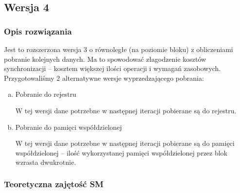 \subsection{Wersja 4}

\subsubsection{Opis rozwiązania}

Jest to rozszerzona wersja 3 o równoległe (na poziomie bloku) z obliczeniami pobranie kolejnych danych. Ma to spowodować złagodzenie kosztów synchronizacji -- kosztem większej ilości operacji i wymagań zasobowych.\\
Przygotowaliśmy 2 alternatywne wersje wyprzedzającego pobrania:

\begin{enumerate}[(a)]

\item Pobranie do rejestru

W tej wersji dane potrzebne w następnej iteracji pobierane są do rejestru.



\item Pobranie do pamięci współdzielonej

W tej wersji dane potrzebne w następnej iteracji pobierane są do pamięci współdzielonej -- ilość wykorzystanej pamięci współdzielonej przez blok wzrasta dwukrotnie.



\end{enumerate}

\subsubsection{Teoretyczna zajętość SM}

